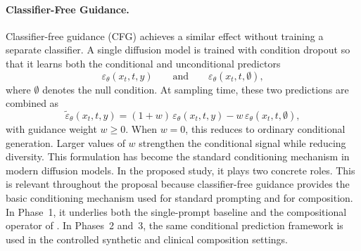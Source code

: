 \paragraph{Classifier-Free Guidance.}
Classifier-free guidance (CFG) \citep{ho2022classifier} achieves a similar effect without
training a separate classifier. A single diffusion model is trained with condition dropout
so that it learns both the conditional and unconditional predictors
\[
\varepsilon_\theta(x_t,t,y)
\qquad\text{and}\qquad
\varepsilon_\theta(x_t,t,\emptyset),
\]
where \(\emptyset\) denotes the null condition. At sampling time, these two predictions are
combined as
\begin{equation}
\tilde{\varepsilon}_\theta(x_t,t,y)
=
(1+w)\,\varepsilon_\theta(x_t,t,y)
-
w\,\varepsilon_\theta(x_t,t,\emptyset),
\label{eq:guided_eps_cfg}
\end{equation}
with guidance weight \(w \ge 0\). When \(w=0\), this reduces to ordinary conditional
generation. Larger values of \(w\) strengthen the conditional signal while reducing
diversity. This formulation has become the standard conditioning mechanism in modern
diffusion models. In the proposed study, it plays two concrete roles. 
This is relevant throughout the proposal because classifier-free guidance provides the basic conditioning mechanism used for standard prompting and for composition. 
In Phase~1, it underlies both the single-prompt baseline and the compositional operator of \citet{liu2022compositional}. 
In Phases~2 and~3, the same conditional prediction framework is used in the controlled synthetic and clinical composition settings.

